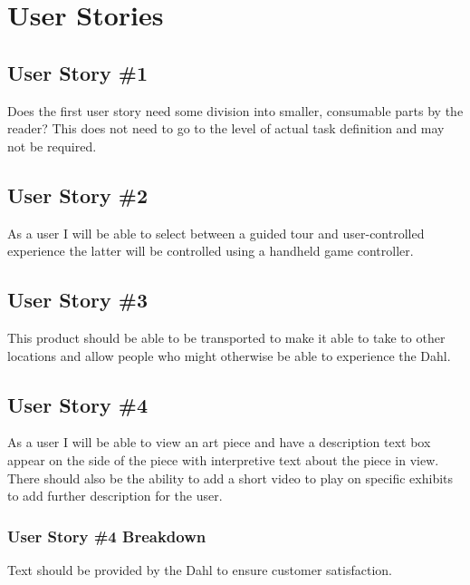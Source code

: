 \section{User Stories}




\subsection{User Story \#1}
Does the first user story need some division into smaller, consumable parts by 
the reader?  This does not need to go to the level of actual task definition and 
may not be required. 

\subsection{User Story \#2} 
As a user I will be able to select between a guided tour and user-controlled experience the latter
will be controlled using a handheld game controller.

\subsection{User Story \#3} 
This product should be able to be transported to make it able to take to other locations and 
allow people who might otherwise be able to experience the Dahl.

\subsection{User Story \#4} 
As a user I will be able to view an art piece and have a description text box appear on the side of
the piece with interpretive text about the piece in view.  There should also be the ability to add 
a short video to play on specific exhibits to add further description for the user.

\subsubsection{User Story \#4 Breakdown}
Text should be provided by the Dahl to ensure customer satisfaction.


